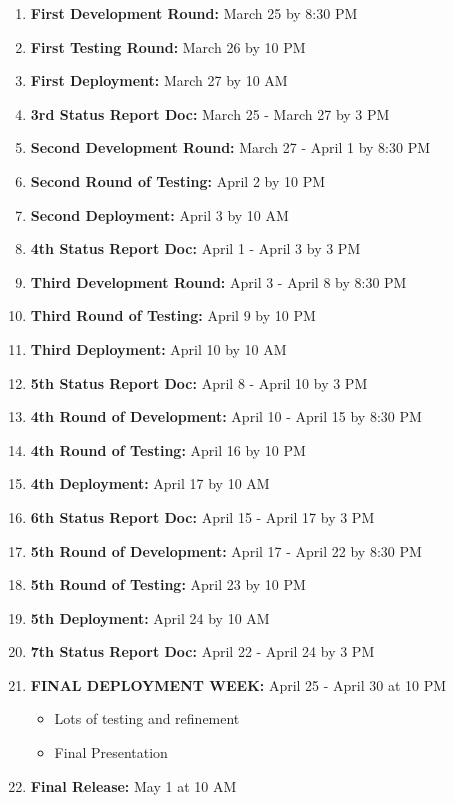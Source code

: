 \documentclass[letterpaper,12pt,oneside,listof=totoc]{scrreprt}
\begin{document}
\begin{enumerate}
    \item \textbf{First Development Round:} March 25 by 8:30 PM
    \item \textbf{First Testing Round:} March 26 by 10 PM
    \item \textbf{First Deployment:} March 27 by 10 AM
    
    \item \textbf{3rd Status Report Doc:} March 25 - March 27 by 3 PM
    
    \item \textbf{Second Development Round:} March 27 - April 1 by 8:30 PM
    \item \textbf{Second Round of Testing:} April 2 by 10 PM
    \item \textbf{Second Deployment:} April 3 by 10 AM
    
    \item \textbf{4th Status Report Doc:} April 1 - April 3 by 3 PM
    
    \item \textbf{Third Development Round:} April 3 - April 8 by 8:30 PM
    \item \textbf{Third Round of Testing:} April 9 by 10 PM
    \item \textbf{Third Deployment:} April 10 by 10 AM
    
    \item \textbf{5th Status Report Doc:} April 8 - April 10 by 3 PM
    
    \item \textbf{4th Round of Development:} April 10 - April 15 by 8:30 PM
    \item \textbf{4th Round of Testing:} April 16 by 10 PM
    \item \textbf{4th Deployment:} April 17 by 10 AM
    
    \item \textbf{6th Status Report Doc:} April 15 - April 17 by 3 PM
    
    \item \textbf{5th Round of Development:} April 17 - April 22 by 8:30 PM
    \item \textbf{5th Round of Testing:} April 23 by 10 PM
    \item \textbf{5th Deployment:} April 24 by 10 AM
    
    \item \textbf{7th Status Report Doc:} April 22 - April 24 by 3 PM
    
    \item \textbf{FINAL DEPLOYMENT WEEK:} April 25 - April 30 at 10 PM
        \begin{itemize}
            \item Lots of testing and refinement
            \item Final Presentation
        \end{itemize}
    \item \textbf{Final Release:} May 1 at 10 AM
\end{enumerate}
\end{document}

